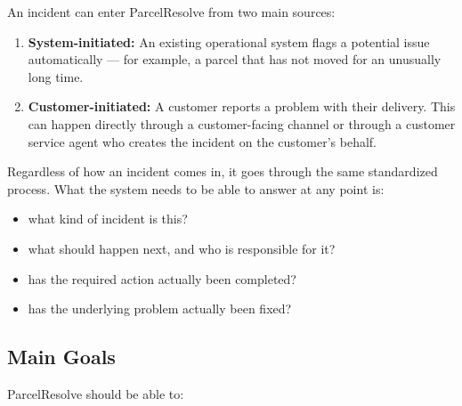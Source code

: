 \documentclass[11pt,a4paper]{article}
\begin{document}
An incident can enter ParcelResolve from two main sources:

\begin{enumerate}
    \item \textbf{System-initiated:}
    An existing operational system flags a potential issue
    automatically --- for example, a parcel that has not moved for
    an unusually long time.

    \item \textbf{Customer-initiated:}
    A customer reports a problem with their delivery. This can happen
    directly through a customer-facing channel or through a customer
    service agent who creates the incident on the customer's behalf.
\end{enumerate}

Regardless of how an incident comes in, it goes through the same
standardized process. What the system needs to be able to answer at
any point is:

\begin{itemize}
    \item what kind of incident is this?
    \item what should happen next, and who is responsible for it?
    \item has the required action actually been completed?
    \item has the underlying problem actually been fixed?
\end{itemize}


\subsection{Main Goals}

ParcelResolve should be able to:
\end{document}
